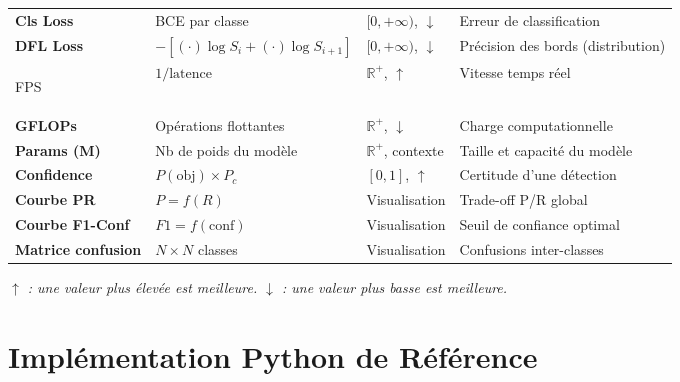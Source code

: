 \documentclass[12pt, a4paper]{report}
\begin{document}
\begin{longtable}{>{\bfseries}p{3.2cm} p{3.8cm} p{3.5cm} p{3.5cm}}
  Cls Loss
    & BCE par classe
    & $[0, +\infty)$, $\downarrow$
    & Erreur de classification \\[4pt]

  DFL Loss
    & $-[(\cdot)\log S_i + (\cdot)\log S_{i+1}]$
    & $[0, +\infty)$, $\downarrow$
    & Précision des bords (distribution) \\[4pt]

  \midrule

  FPS
    & $1/\text{latence}$
    & $\mathbb{R}^+$, $\uparrow$
    & Vitesse temps réel \\[4pt]

  GFLOPs
    & Opérations flottantes
    & $\mathbb{R}^+$, $\downarrow$
    & Charge computationnelle \\[4pt]

  Params (M)
    & Nb de poids du modèle
    & $\mathbb{R}^+$, contexte
    & Taille et capacité du modèle \\[4pt]

  Confidence
    & $P(\text{obj}) \times P_c$
    & $[0, 1]$, $\uparrow$
    & Certitude d'une détection \\[4pt]

  Courbe PR
    & $P = f(R)$
    & Visualisation
    & Trade-off P/R global \\[4pt]

  Courbe F1-Conf
    & $F1 = f(\text{conf})$
    & Visualisation
    & Seuil de confiance optimal \\[4pt]

  Matrice confusion
    & $N \times N$ classes
    & Visualisation
    & Confusions inter-classes \\

\end{longtable}

\textit{$\uparrow$ : une valeur plus élevée est meilleure. $\downarrow$ : une
valeur plus basse est meilleure.}

\chapter{Implémentation Python de Référence}
\end{document}
